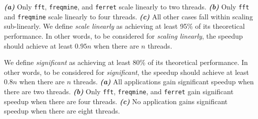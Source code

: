 

\emph{\textbf{(a)}} Only \texttt{fft},  \texttt{freqmine}, and \texttt{ferret} scale linearly to two threads. 
\emph{\textbf{(b)}} Only \texttt{fft} and \texttt{freqmine} scale linearly to four threads.
\emph{\textbf{(c)}} All other cases fall within scaling sub-linearly.
We define \emph{scale linearly} as achieving at least 95\% of its theoretical performance. In other words, to be considered for \emph{scaling linearly}, the speedup should achieve at least $0.95n$ when there are $n$ threads.

We define \emph{significant} as achieving at least 80\% of its theoretical performance.
In other words, to be considered for \emph{significant}, 
the speedup should achieve at least $0.8n$ when there are $n$ threads.
\emph{\textbf{(a)}} All applications gain significant speedup when there are two threads.
\emph{\textbf{(b)}} Only \texttt{fft}, \texttt{freqmine}, and \texttt{ferret} gain significant speedup when there are 
four threads. 
\emph{\textbf{(c)}} No application gains significant speedup when there are eight threads. 